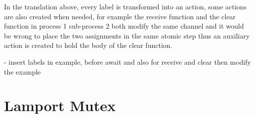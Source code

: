 \documentclass{thesul}
\begin{document}
\begin{appendices}
\begin{lstlisting}[caption = TLA+ translation for Sub-Processes, frame = tlrb, firstnumber = 1]
\end{lstlisting}

In the translation above, every label is transformed into an action, some actions are also created when needed, for example the receive function and the clear function in process 1 sub-process 2 both modify the same channel and it would be wrong to place the two assignments in the same atomic step thus an auxiliary action is created to hold the body of the clear function.

- insert labels in example, before await and also for receive and clear then modify the example


\section{Lamport Mutex}

\end{appendices}



\end{document}
